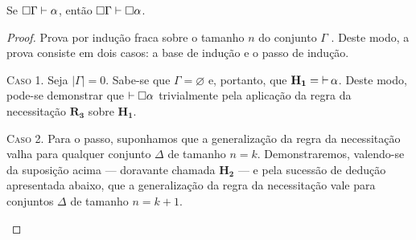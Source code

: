     \begin{theorem}\label{gen-nec}
        Se $\Box\Gamma\mathrel{\vdash}\alpha$, então $\Box\Gamma\mathrel{\vdash}\Box\alpha$.
        \begin{proof}
            Prova por indução fraca sobre o tamanho $n$ do conjunto $\Gamma$ \citep{Troelstra}.
            Deste modo, a prova consiste em dois casos: a base de indução e o passo de indução.
            \begin{case}
                \textsc{Caso 1.}
                Seja $|\Gamma|=0$.
                Sabe-se que $\Gamma=\varnothing$ e, portanto, que $\mathbf{H_1}=\mathop{\vdash}\alpha$.
                Deste modo, pode-se demonstrar que $\mathrel{\vdash}\Box\alpha$ trivialmente pela aplicação da regra da necessitação \hyperref[necessitation]{$\mathbf{R_3}$} sobre $\mathbf{H_1}$.
            \end{case}
            \begin{case}
                \textsc{Caso 2.} 
                Para o passo, suponhamos que a generalização da regra da necessitação valha para qualquer conjunto $\Delta$ de tamanho $n=k$.
                Demonstraremos, valendo-se da suposição acima --- doravante chamada $\mathbf{H_2}$ --- e pela sucessão de dedução apresentada abaixo, que a generalização da regra da necessitação vale para conjuntos $\Delta$ de tamanho $n=k+1$.


\end{case}
\end{proof}
\end{theorem}
